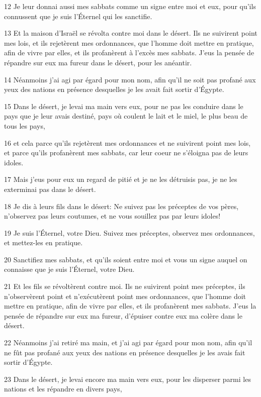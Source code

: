 \par 12 Je leur donnai aussi mes sabbats comme un signe entre moi et eux, pour qu'ils connussent que je suis l'Éternel qui les sanctifie.
\par 13 Et la maison d'Israël se révolta contre moi dans le désert. Ils ne suivirent point mes lois, et ils rejetèrent mes ordonnances, que l'homme doit mettre en pratique, afin de vivre par elles, et ils profanèrent à l'excès mes sabbats. J'eus la pensée de répandre sur eux ma fureur dans le désert, pour les anéantir.
\par 14 Néanmoins j'ai agi par égard pour mon nom, afin qu'il ne soit pas profané aux yeux des nations en présence desquelles je les avait fait sortir d'Égypte.
\par 15 Dans le désert, je levai ma main vers eux, pour ne pas les conduire dans le pays que je leur avais destiné, pays où coulent le lait et le miel, le plus beau de tous les pays,
\par 16 et cela parce qu'ils rejetèrent mes ordonnances et ne suivirent point mes lois, et parce qu'ils profanèrent mes sabbats, car leur coeur ne s'éloigna pas de leurs idoles.
\par 17 Mais j'eus pour eux un regard de pitié et je ne les détruisis pas, je ne les exterminai pas dans le désert.
\par 18 Je dis à leurs fils dans le désert: Ne suivez pas les préceptes de vos pères, n'observez pas leurs coutumes, et ne vous souillez pas par leurs idoles!
\par 19 Je suis l'Éternel, votre Dieu. Suivez mes préceptes, observez mes ordonnances, et mettez-les en pratique.
\par 20 Sanctifiez mes sabbats, et qu'ils soient entre moi et vous un signe auquel on connaisse que je suis l'Éternel, votre Dieu.
\par 21 Et les fils se révoltèrent contre moi. Ils ne suivirent point mes préceptes, ils n'observèrent point et n'exécutèrent point mes ordonnances, que l'homme doit mettre en pratique, afin de vivre par elles, et ils profanèrent mes sabbats. J'eus la pensée de répandre sur eux ma fureur, d'épuiser contre eux ma colère dans le désert.
\par 22 Néanmoins j'ai retiré ma main, et j'ai agi par égard pour mon nom, afin qu'il ne fût pas profané aux yeux des nations en présence desquelles je les avais fait sortir d'Égypte.
\par 23 Dans le désert, je levai encore ma main vers eux, pour les disperser parmi les nations et les répandre en divers pays,
